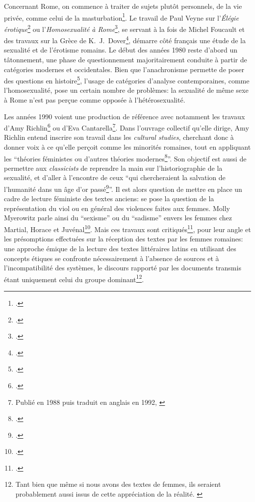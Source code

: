 Concernant Rome, on commence à traiter de sujets plutôt personnels, de la vie privée, comme celui de la masturbation\footcite{krenkel_masturbation_1979}. Le travail de Paul Veyne sur l'\textit{Élégie érotique}\footcite{veyne_lelegie_1983} ou l'\textit{Homosexualité à Rome}\footcite{veyne_homosexualite_1982}, se servant à la fois de Michel Foucault et des travaux sur la Grèce de K.~J.~Dover\footcite{dover_greek_1979}, démarre côté français une étude de la sexualité et de l'érotisme romains. Le début des années 1980 reste d'abord un tâtonnement, une phase de questionnement majoritairement conduite à partir de catégories modernes et occidentales. Bien que l'anachronisme permette de poser des questions en histoire\footcite{loraux_eloge_2005}, l'usage de catégories d'analyse contemporaines, comme l'homosexualité, pose un certain nombre de problèmes: la sexualité de même sexe à Rome n'est pas perçue comme opposée à l'hétérosexualité. 

Les années 1990 voient une production de référence avec notamment les travaux d'Amy Richlin\footcite{richlin1992pornography, richlin1993not} ou d'Eva Cantarella\footnote{Publié en 1988 puis traduit en anglais en 1992, \textcite{cantarella_bisexuality_1992, cantarella_secondo_1988}}.%
Dans l'ouvrage collectif qu'elle dirige, Amy Richlin entend inscrire son travail dans les \textit{cultural studies}, cherchant donc à donner voix à ce qu'elle perçoit comme les minorités romaines, tout en appliquant les \enquote{théories féministes ou d'autres théories modernes\footcite[p.~XI]{richlin1992pornography}}. Son objectif est aussi de permettre aux \textit{classicists} de reprendre la main sur l'historiographie de la sexualité, et d'aller à l'encontre de ceux \enquote{qui chercheraient la salvation de l'humanité dans un âge d'or passé\footcite[p.~XVIII]{richlin1992pornography}}. Il est alors question de mettre en place un cadre de lecture féministe des textes anciens: se pose la question de la représentation du viol ou en général des violences faites aux femmes. Molly Myerowitz parle ainsi du \enquote{sexisme} ou du \enquote{sadisme} envers les femmes chez Martial, Horace et Juvénal\footcite{myerowitz1992domestication}. Mais ces travaux sont critiqués\footcite{frontisi2004ovide}, pour leur angle et les présomptions effectuées sur la réception des textes par les femmes romaines: une approche émique de la lecture des textes littéraires latins en utilisant des concepts étiques se confronte nécessairement à l'absence de sources et à l'incompatibilité des systèmes, le discours rapporté par les documents transmis étant uniquement celui du groupe dominant\footnote{Tant bien que même si nous avons des textes de femmes, ils seraient probablement aussi issus de cette appréciation de la réalité. \textcite{cuchet_hommes_2011}}.

